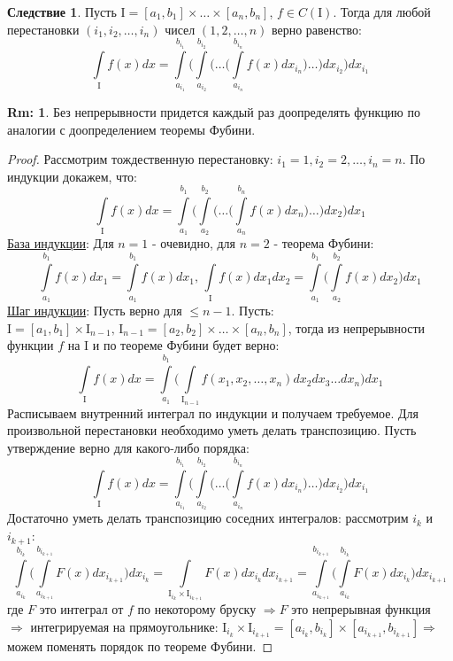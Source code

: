 \documentclass[12pt]{article}
\newcommand{\MI}{\mathrm{I}}
\theoremstyle{definition}
\newtheorem{rem}{Rm:}
\newtheorem{corollary}{Следствие}
\newcommand{\ddint}[2]{\displaystyle\int\limits_{#1}^{#2}}
\begin{document}
\begin{corollary}
	Пусть $\MI = [a_1,b_1]\times \dotsc \times [a_n,b_n]$, $f \in C(\MI)$. Тогда для любой перестановки $(i_1, i_2,\dotsc,i_n)$ чисел $(1,2,\dotsc,n)$ верно равенство:
	$$
		\ddint{\MI}{}f(x)dx = \ddint{a_{i_1}}{b_{i_1}}\Bigg(\ddint{a_{i_2}}{b_{i_2}}\Bigg( \dotsc \Bigg(   \ddint{a_{i_n}}{b_{i_n}}f(x)dx_{i_n}\Bigg)  \dotsc  \Bigg)   dx_{i_2}\Bigg) dx_{i_1}
	$$
\end{corollary}
\begin{rem}
	Без непрерывности придется каждый раз доопределять функцию по аналогии с доопределением теоремы Фубини.
\end{rem}
\begin{proof}
	Рассмотрим тождественную перестановку: $i_1 = 1, i_2 = 2, \dotsc, i_n = n$. По индукции докажем, что:
	$$
		\ddint{\MI}{}f(x)dx = \ddint{a_1}{b_1}\Bigg(\ddint{a_2}{b_2}\Bigg( \dotsc \Bigg(   \ddint{a_n}{b_n}f(x)dx_n\Bigg)  \dotsc  \Bigg)   dx_2\Bigg) dx_1
	$$
	\uline{База индукции}: Для $n = 1$ - очевидно, для $n = 2$ - теорема Фубини:
	$$
		\ddint{a_1}{b_1}f(x)dx_1 = \ddint{a_1}{b_1}f(x)dx_1, \, \ddint{\MI}{}f(x)dx_1dx_2 = \ddint{a_1}{b_1}\Bigg( \ddint{a_2}{b_2}f(x) dx_2\Bigg)dx_1
	$$
	\uline{Шаг индукции}: Пусть верно для $\leq n-1$. Пусть: $\MI = [a_1,b_1]\times \MI_{n-1}, \, \MI_{n-1} = [a_2,b_2]\times \dotsc \times [a_n,b_n]$, тогда из непрерывности функции $f$ на $\MI$ и по теореме Фубини будет верно:
	$$
		\ddint{\MI}{}f(x)dx = \ddint{a_1}{b_1}\Bigg( \ddint{\MI_{n-1}}{}f(x_1,x_2,\dotsc,x_n)dx_2dx_3\dotsc dx_n \Bigg)dx_1
	$$
	Расписываем внутренний интеграл по индукции и получаем требуемое. Для произвольной перестановки необходимо уметь делать транспозицию. Пусть утверждение верно для какого-либо порядка:
	$$
		\ddint{\MI}{}f(x)dx = \ddint{a_{i_1}}{b_{i_1}}\Bigg(\ddint{a_{i_2}}{b_{i_2}}\Bigg( \dotsc \Bigg(   \ddint{a_{i_n}}{b_{i_n}}f(x)dx_{i_n}\Bigg)  \dotsc  \Bigg)   dx_{i_2}\Bigg) dx_{i_1}
	$$
	Достаточно уметь делать транспозицию соседних интегралов: рассмотрим $i_k$ и $i_{k+1}$:
	$$
		\ddint{a_{i_k}}{b_{i_k}}\Bigg(  \ddint{a_{i_{k+1}}}{b_{i_{k+1}}} F(x)dx_{i_{k+1}}\Bigg)dx_{i_k} = \ddint{\MI_{i_k} \times \MI_{i_{k+1}}}{} F(x)dx_{i_k}dx_{i_{k+1}} = \ddint{a_{i_{k+1}}}{b_{i_{k+1}}} \Bigg( \ddint{a_{i_k}}{b_{i_k}}  F(x)dx_{i_k}\Bigg)dx_{i_{k+1}}
	$$
	где $F$ это интеграл от $f$ по некоторому бруску $\Rightarrow F$ это непрерывная функция $\Rightarrow$ интегрируемая на прямоугольнике: $\MI_{i_k} \times \MI_{i_{k+1}} = [a_{i_k},b_{i_k}]\times[a_{i_{k+1}},b_{i_{k+1}}] \Rightarrow$ можем поменять порядок по теореме Фубини.
\end{proof}
\newpage
\end{document}
